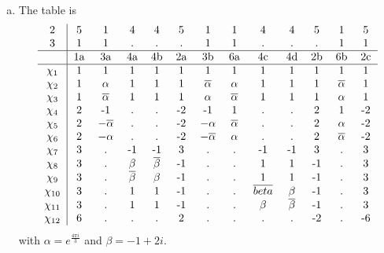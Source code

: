 \documentclass[leqno]{article}
\begin{document}
\begin{solution}~
\begin{enumerate}[(a)]
    \item The table is
    \[
    \begin{tabular}{c|cccccccccccc}
        2 & 5 & 1 & 4 & 4 & 5 & 1 & 1 & 4 & 4 & 5 & 1 & 5  \\
        3 & 1 & 1 & . & . & . & 1 & 1 & . & . & . & 1 & 1\\
        \hline
        ~ & 1a & 3a & 4a & 4b & 2a & 3b & 6a & 4c & 4d & 2b & 6b & 2c \\
        \hline
        $\chi_1$ & 1 & 1 & 1 & 1 & 1 & 1 & 1 & 1 & 1 & 1 & 1 & 1\\
        $\chi_2$ & 1 & $\alpha$ & 1 & 1 & 1 & $\overline{\alpha}$ & $\alpha$ & 1 & 1 & 1 & $\overline{\alpha}$ & 1\\
        $\chi_3$ & 1 & $\overline{\alpha}$ & 1 & 1 & 1 & $\alpha$ & $\overline{\alpha}$ & 1 & 1 & 1 & $\alpha$ & 1\\
        $\chi_4$ & 2 & -1 & . & . & -2 & -1 & 1 & . & . & 2 & 1 & -2\\
        $\chi_5$ & 2 & $-\overline{\alpha}$ & . & . & -2 & $-\alpha$ & $\overline{\alpha}$ & . & . & 2 & $\alpha$ & -2\\
        $\chi_6$ & 2 & $-\alpha$ & . & . & -2 & $-\overline{\alpha}$ & $\alpha$ & . & . & 2 & $\overline{\alpha}$ & -2\\
        $\chi_7$ & 3 & . & -1 & -1 & 3 & . & . & -1 & -1 & 3 & . & 3\\
        $\chi_8$ & 3 & . & $\beta$ & $\overline{\beta}$ & -1 & . & . & 1 & 1 & -1 & . & 3\\
        $\chi_9$ & 3 & . & $\overline{\beta}$ & $\beta$ & -1 & . & . & 1 & 1 & -1 & . & 3\\
        $\chi_{10}$ & 3 & . & 1 & 1 & -1 & . & . & $\overline{beta}$ & $\beta$ & -1 & . & 3\\
        $\chi_{11}$ & 3 & . & 1 & 1 & -1 & . & . & $\beta$ & $\overline{\beta}$ & -1 & . & 3\\
        $\chi_{12}$ & 6 & . & . & . & 2 & . & . & . & . & -2 & . & -6
    \end{tabular}
    \]
    with $\alpha = e^{\frac{4\pi i}{3}}$ and $\beta = -1 + 2i$. 
    

\end{enumerate}
\end{solution}
\end{document}
